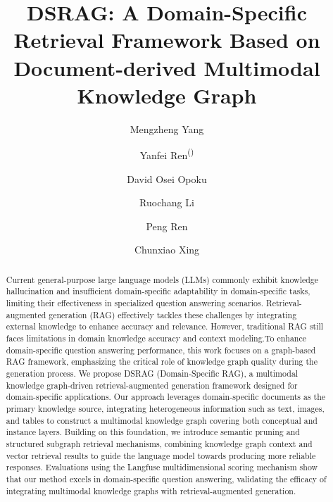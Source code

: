 \documentclass[runningheads]{llncs}
\begin{document}
\title{DSRAG: A Domain-Specific Retrieval Framework Based on Document-derived Multimodal Knowledge Graph}


\author{
  Mengzheng Yang \and
  Yanfei Ren\textsuperscript{(\Letter)} \and
  David Osei Opoku \and
  Ruochang Li \and
  Peng Ren \and
  Chunxiao Xing
}





\maketitle

\begin{abstract}
Current general-purpose large language models (LLMs) commonly exhibit knowledge hallucination and insufficient domain-specific adaptability in domain-specific tasks, limiting their effectiveness in specialized question answering scenarios. Retrieval-augmented generation (RAG) effectively tackles these challenges by integrating external knowledge to enhance accuracy and relevance. However, traditional RAG still faces limitations in domain knowledge accuracy and context modeling.To enhance domain-specific question answering performance, this work focuses on a graph-based RAG framework, emphasizing the critical role of knowledge graph quality during the generation process. We propose DSRAG (Domain-Specific RAG), a multimodal knowledge graph-driven retrieval-augmented generation framework designed for domain-specific applications. Our approach leverages domain-specific documents as the primary knowledge source, integrating heterogeneous information such as text, images, and tables to construct a multimodal knowledge graph covering both conceptual and instance layers. Building on this foundation, we introduce semantic pruning and structured subgraph retrieval mechanisms, combining knowledge graph context and vector retrieval results to guide the language model towards producing more reliable responses. Evaluations using the Langfuse multidimensional scoring mechanism show that our method excels in domain-specific question answering, validating the efficacy of integrating multimodal knowledge graphs with retrieval-augmented generation.

\end{abstract}
%
%
%
\end{document}
